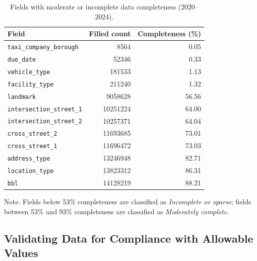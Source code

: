 \documentclass[linenumber]{jdsart}
\begin{document}
\begin{table}[tbp]
\centering
\caption{Fields with moderate or incomplete data completeness (2020--2024).}
\label{tab:completeness-lower}
\small
\begin{tabular}{l r r}
\toprule
\textbf{Field} & \textbf{Filled count} & \textbf{Completeness (\%)} \\
\midrule
\texttt{taxi\_company\_borough} & \num[round-mode=none]{8564} & 0.05 \\
\texttt{due\_date} & \num[round-mode=none]{52346} & 0.33 \\
\texttt{vehicle\_type} & \num[round-mode=none]{181533} & 1.13 \\
\texttt{facility\_type} & \num[round-mode=none]{211240} & 1.32 \\
\cmidrule(lr){1-3}
\texttt{landmark} & \num[round-mode=none]{9058628} & 56.56 \\
\texttt{intersection\_street\_1} & \num[round-mode=none]{10251224} & 64.00 \\
\texttt{intersection\_street\_2} & \num[round-mode=none]{10257371} & 64.04 \\
\texttt{cross\_street\_2} & \num[round-mode=none]{11693685} & 73.01 \\
\texttt{cross\_street\_1} & \num[round-mode=none]{11696472} & 73.03 \\
\texttt{address\_type} & \num[round-mode=none]{13246948} & 82.71 \\
\texttt{location\_type} & \num[round-mode=none]{13823312} & 86.31 \\
\texttt{bbl} & \num[round-mode=none]{14128219} & 88.21 \\
\bottomrule
\end{tabular}

  \vspace{6pt}
  \raggedright
  \footnotesize
  Note. Fields below 53\% completeness are classified as \emph{Incomplete or
  sparse}; fields between 53\% and 93\% completeness are classified as
  \emph{Moderately complete}.
\end{table}



\subsection{Validating Data for Compliance with Allowable Values}
\label{subsec:domain}
\end{document}
